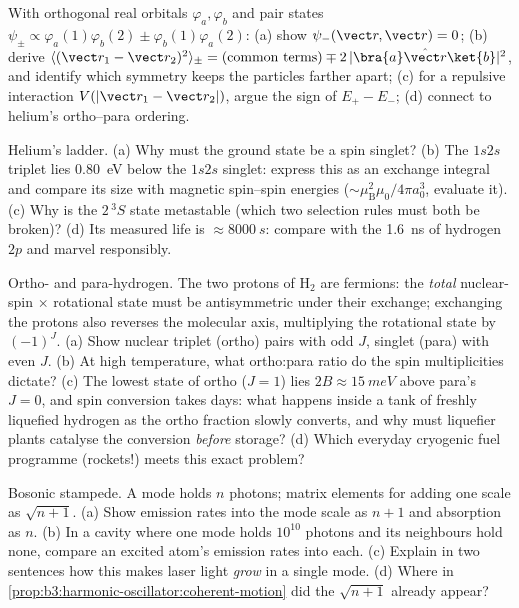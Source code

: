 \begin{exercise}[$\star\star$]\label{exo:b3:identical-particles:6}
With orthogonal real orbitals $\varphi_a, \varphi_b$ and pair
states $\psi_\pm \propto \varphi_a(1)\varphi_b(2) \pm
\varphi_b(1)\varphi_a(2)$: (a) show $\psi_-(\vect r, \vect r) = 0$;
(b) derive
$\langle(\vect r_1 - \vect r_2)^2\rangle_\pm =
(\text{common terms}) \mp 2\,|\bra{a}\hat{\vect r}\ket{b}|^2$, and
identify which symmetry keeps the particles farther apart; (c) for
a repulsive interaction $V(|\vect r_1 - \vect r_2|)$, argue the
sign of $E_+ - E_-$; (d) connect to helium's ortho--para ordering.
\end{exercise}

\begin{exercise}[$\star\star$]\label{exo:b3:identical-particles:7}
Helium's ladder. (a) Why must the ground state be a spin singlet?
(b) The $1s2s$ triplet lies \qty{0.80}{eV} below the $1s2s$
singlet: express this as an exchange integral and compare its size
with magnetic spin--spin energies ($\sim\mu_{\text{B}}^2\mu_0/4\pi
a_0^3$, evaluate it). (c) Why is the $2\,^3S$ state metastable
(which two selection rules must both be broken)? (d) Its measured
life is $\approx\qty{8000}{s}$: compare with the \qty{1.6}{ns} of
hydrogen $2p$ and marvel responsibly.
\end{exercise}

\begin{exercise}[$\star\star$]\label{exo:b3:identical-particles:8}
Ortho- and para-hydrogen. The two protons of H$_2$ are fermions:
the \emph{total} nuclear-spin $\times$ rotational state must be
antisymmetric under their exchange; exchanging the protons also
reverses the molecular axis, multiplying the rotational state by
$(-1)^J$. (a) Show nuclear triplet (ortho) pairs with odd $J$,
singlet (para) with even $J$. (b) At high temperature, what
ortho:para ratio do the spin multiplicities dictate? (c) The
lowest state of ortho ($J = 1$) lies $2B \approx \qty{15}{meV}$
above para's $J = 0$, and spin conversion takes days: what happens
inside a tank of freshly liquefied hydrogen as the ortho fraction
slowly converts, and why must liquefier plants catalyse the
conversion \emph{before} storage? (d) Which everyday cryogenic
fuel programme (rockets!) meets this exact problem?
\end{exercise}

\begin{exercise}[$\star\star$]\label{exo:b3:identical-particles:9}
Bosonic stampede. A mode holds $n$ photons; matrix elements for
adding one scale as $\sqrt{n+1}$. (a) Show emission rates into the
mode scale as $n + 1$ and absorption as $n$. (b) In a cavity where
one mode holds $10^{10}$ photons and its neighbours hold none,
compare an excited atom's emission rates into each. (c) Explain in
two sentences how this makes laser light \emph{grow} in a single
mode. (d) Where in \cref{prop:b3:harmonic-oscillator:coherent-motion}
did the $\sqrt{n+1}$ already appear?
\end{exercise}

